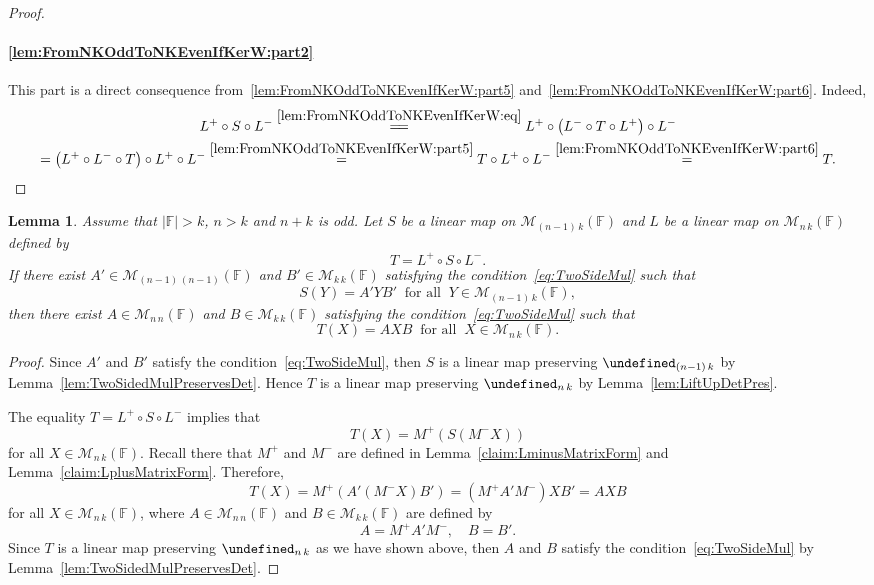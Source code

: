 \documentclass{elsarticle}
\def\F{{\mathbb F}}
\def\M{{\mathcal M}}
\let\det\undefined
\DeclareMathOperator{\det}{det}
\theoremstyle{plain}
\newtheorem{lemma}[theorem]{Lemma}
\theoremstyle{definition}
\numberwithin{equation}{section}
\begin{document}
\begin{proof}
\paragraph{\ref{lem:FromNKOddToNKEvenIfKerW:part2}} This part is a direct consequence from~\ref{lem:FromNKOddToNKEvenIfKerW:part5} and~\ref{lem:FromNKOddToNKEvenIfKerW:part6}. Indeed, 
\begin{multline*}
L^{+} \circ S \circ L^{-} \overset{\eqref{lem:FromNKOddToNKEvenIfKerW:eq}}{=\joinrel=} L^{+} \circ \left(L^{-} \circ T \circ L^{+} \right)\circ L^{-}\\
 = \left(L^{+} \circ L^{-} \circ T\right) \circ L^{+} \circ L^{-} \overset{\ref{lem:FromNKOddToNKEvenIfKerW:part5}}{=} T \circ L^{+} \circ L^{-} \overset{\ref{lem:FromNKOddToNKEvenIfKerW:part6}}{=} T.
\end{multline*}
\end{proof}

\begin{lemma}\label{lem:MatRepLift}Assume that  $|\F| > k$, $n > k$ and $n + k$ is odd. Let $S$ be a linear map on $\M_{(n-1)\,k}(\F)$ and $L$ be a linear map on $\M_{n\,k}(\F)$ defined by 
\[
T = L^{+}\circ S \circ L^{-}.
\] If there exist $A' \in \M_{(n-1)\,(n-1)}(\F)$ and $B' \in \M_{k\,k}(\F)$ satisfying the condition~\eqref{eq:TwoSideMul} such that 
\[
S(Y) = A'YB'\;\;\mbox{for all}\;\; Y \in \M_{(n-1)\,k}(\F),
\]
then there exist $A \in \M_{n\, n}(\F)$ and $B \in \M_{k\, k}(\F)$ satisfying the condition~\eqref{eq:TwoSideMul} such that
\[
T(X) = AXB\;\;\mbox{for all}\;\; X \in \M_{n\,k}(\F).
\]
\end{lemma}
\begin{proof}Since $A'$ and $B'$ satisfy  the condition~\eqref{eq:TwoSideMul}, then $S$ is a linear map preserving $\det_{(n-1)\,k}$ by Lemma~\ref{lem:TwoSidedMulPreservesDet}. Hence $T$ is a linear map preserving $\det_{n\,k}$ by Lemma~\ref{lem:LiftUpDetPres}.

The equality $T = L^{+} \circ S \circ L^{-}$ implies that
\[
T(X) = M^{+}(S(M^{-}X))
\]
for all $X \in \M_{n\,k}(\F)$. Recall there that $M^{+}$ and $M^{-}$ are defined in Lemma~\ref{claim:LminusMatrixForm} and Lemma~\ref{claim:LplusMatrixForm}. Therefore, \[
T(X) = M^{+}(A'(M^{-}X)B') = (M^{+}A'M^{-})XB' = AXB
\]
for all $X \in \M_{n\,k}(\F)$, where $A\in\M_{n\,n}(\F)$ and $B\in \M_{k\,k}(\F)$ are defined by
\[
A = M^{+}A'M^{-}, \quad B = B'.
\]
Since $T$ is a linear map preserving $\det_{n\,k}$ as we have shown above, then $A$ and $B$ satisfy the condition~\eqref{eq:TwoSideMul} by Lemma~\ref{lem:TwoSidedMulPreservesDet}. 
\end{proof}
\end{document}
